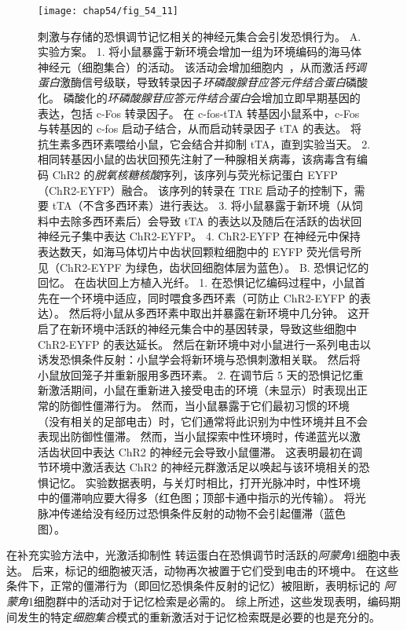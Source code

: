 \begin{figure}[htbp]
	\centering
	\texttt{[image: chap54/fig\_54\_11]}
	\caption{刺激与存储的恐惧调节记忆相关的神经元集合会引发恐惧行为\cite{liu2012optogenetic}。
		A. 实验方案。
		1. 将小鼠暴露于新环境会增加一组为环境编码的海马体神经元（细胞集合）的活动。
		该活动会增加细胞内~，从而激活\textit{钙调蛋白}激酶信号级联，导致转录因子\textit{环磷酸腺苷应答元件结合蛋白}磷酸化。
		磷酸化的\textit{环磷酸腺苷应答元件结合蛋白}会增加立即早期基因的表达，包括 c-Fos 转录因子。
		在 c-fos-tTA 转基因小鼠系中，c-Fos 与转基因的 c-fos 启动子结合，从而启动转录因子 tTA 的表达。
		将抗生素多西环素喂给小鼠，它会结合并抑制 tTA，直到实验当天。
		2. 相同转基因小鼠的齿状回预先注射了一种腺相关病毒，该病毒含有编码 ChR2 的\textit{脱氧核糖核酸}序列，该序列与荧光标记蛋白 EYFP（ChR2-EYFP）融合。
		该序列的转录在 TRE 启动子的控制下，需要 tTA（不含多西环素）进行表达。
		3. 将小鼠暴露于新环境（从饲料中去除多西环素后）会导致 tTA 的表达以及随后在活跃的齿状回神经元子集中表达 ChR2-EYFP。
		4. ChR2-EYFP 在神经元中保持表达数天，如海马体切片中齿状回颗粒细胞中的 EYFP 荧光信号所见（ChR2-EYPF 为绿色，齿状回细胞体层为蓝色）。 
		B. 恐惧记忆的回忆。
		在齿状回上方植入光纤。
		1. 在恐惧记忆编码过程中，小鼠首先在一个环境中适应，同时喂食多西环素（可防止 ChR2-EYFP 的表达）。
		然后将小鼠从多西环素中取出并暴露在新环境中几分钟。
		这开启了在新环境中活跃的神经元集合中的基因转录，导致这些细胞中 ChR2-EYFP 的表达延长。
		然后在新环境中对小鼠进行一系列电击以诱发恐惧条件反射：小鼠学会将新环境与恐惧刺激相关联。
		然后将小鼠放回笼子并重新服用多西环素。
		2. 在调节后 5 天的恐惧记忆重新激活期间，小鼠在重新进入接受电击的环境（未显示）时表现出正常的防御性僵滞行为。
		然而，当小鼠暴露于它们最初习惯的环境（没有相关的足部电击）时，它们通常将此识别为中性环境并且不会表现出防御性僵滞。
		然而，当小鼠探索中性环境时，传递蓝光以激活齿状回中表达 ChR2 的神经元会导致小鼠僵滞。
		这表明最初在调节环境中激活表达 ChR2 的神经元群激活足以唤起与该环境相关的恐惧记忆。
		实验数据表明，与关灯时相比，打开光脉冲时，中性环境中的僵滞响应要大得多（红色图；顶部卡通中指示的光传输）。
		将光脉冲传递给没有经历过恐惧条件反射的动物不会引起僵滞（蓝色图）。}
	\label{fig:54_11}
\end{figure}


在补充实验方法中，光激活抑制性  转运蛋白在恐惧调节时活跃的\textit{阿蒙角}1细胞中表达。
后来，标记的细胞被灭活，动物再次被置于它们受到电击的环境中。
在这些条件下，正常的僵滞行为（即回忆恐惧条件反射的记忆）被阻断，表明标记的 \textit{阿蒙角}1细胞群中的活动对于记忆检索是必需的。
综上所述，这些发现表明，编码期间发生的特定\textit{细胞集合}模式的重新激活对于记忆检索既是必要的也是充分的。


